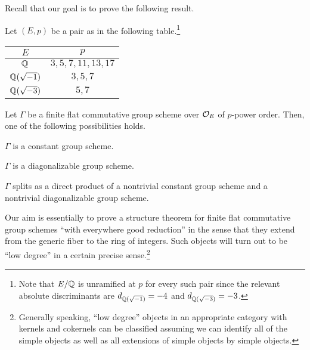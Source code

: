 \documentclass[11pt]{article}
\begin{document}
Recall that our goal is to prove the following result.

\begin{theorem}\label{split}
Let $(E,p)$ be a pair as in the following table.\footnote{Note that $E/\mathbb{Q}$ is unramified at $p$ for every such pair since the relevant absolute discriminants are $d_{\mathbb{Q}(\sqrt{-1})}=-4$ and $d_{\mathbb{Q}(\sqrt{-3})}=-3$.}
\begin{center}
\begin{tabular}{c|c}
$E$ & $p$ \\
\hline
$\mathbb{Q}$ & $3,5,7,11,13,17$ \\
$\mathbb{Q}(\sqrt{-1})$ & $3,5,7$ \\
$\mathbb{Q}(\sqrt{-3})$ & $5,7$
\end{tabular}
\end{center} 
Let $\Gamma$ be a finite flat commutative group scheme over $\mathcal{O}_E$ of $p$-power order. Then, one of the following possibilities holds. 
\begin{enum}{\arabic}
\item $\Gamma$ is a constant group scheme.

\item $\Gamma$ is a diagonalizable group scheme.

\item $\Gamma$ splits as a direct product of a nontrivial constant group scheme and a nontrivial diagonalizable group scheme.
\end{enum}
\end{theorem}

Our aim is essentially to prove a structure theorem for finite flat commutative group schemes ``with everywhere good reduction'' in the sense that they extend from the generic fiber to the ring of integers. Such objects will turn out to be ``low degree'' in a certain precise sense.\footnote{Generally speaking, ``low degree'' objects in an appropriate category with kernels and cokernels can be classified assuming we can identify all of the simple objects as well as all extensions of simple objects by simple objects.} 
\end{document}
